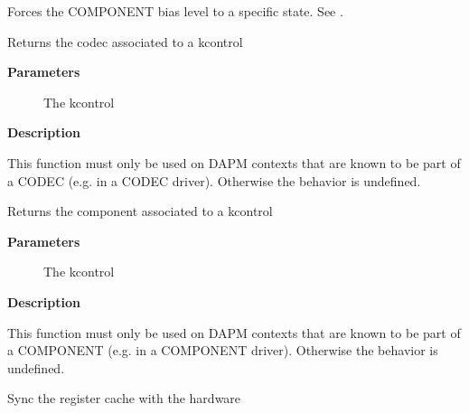 \documentclass[a4paper,8pt,english]{sphinxmanual}
\begin{document}
Forces the COMPONENT bias level to a specific state. See
{\hyperref[sound/kernel\string-api/alsa\string-driver\string-api:c.snd_soc_dapm_force_bias_level]{\emph{}}}.

\begin{fulllineitems}
\label{sound/kernel-api/alsa-driver-api:c.snd_soc_dapm_kcontrol_codec}
Returns the codec associated to a kcontrol

\end{fulllineitems}


\textbf{Parameters}
\begin{description}
\item[{}] \leavevmode
The kcontrol

\end{description}

\textbf{Description}

This function must only be used on DAPM contexts that are known to be part of
a CODEC (e.g. in a CODEC driver). Otherwise the behavior is undefined.

\begin{fulllineitems}
\label{sound/kernel-api/alsa-driver-api:c.snd_soc_dapm_kcontrol_component}
Returns the component associated to a kcontrol

\end{fulllineitems}


\textbf{Parameters}
\begin{description}
\item[{}] \leavevmode
The kcontrol

\end{description}

\textbf{Description}

This function must only be used on DAPM contexts that are known to be part of
a COMPONENT (e.g. in a COMPONENT driver). Otherwise the behavior is undefined.

\begin{fulllineitems}
\label{sound/kernel-api/alsa-driver-api:c.snd_soc_cache_sync}
Sync the register cache with the hardware

\end{fulllineitems}
\end{document}
